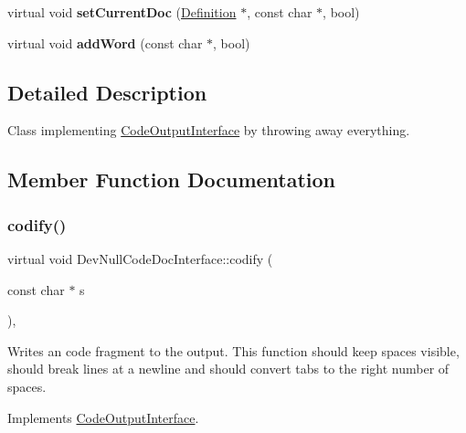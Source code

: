 \begin{DoxyCompactItemize}
\item 
\mbox{\label{class_dev_null_code_doc_interface_aef9f575fa448694b1354e213634f3e95}} 
virtual void {\bfseries set\+Current\+Doc} (\mbox{\hyperlink{class_definition}{Definition}} $\ast$, const char $\ast$, bool)
\item 
\mbox{\label{class_dev_null_code_doc_interface_a8ea71442357b2793532f7bab3a9f6319}} 
virtual void {\bfseries add\+Word} (const char $\ast$, bool)
\end{DoxyCompactItemize}


\subsection{Detailed Description}
Class implementing \mbox{\hyperlink{class_code_output_interface}{Code\+Output\+Interface}} by throwing away everything. 

\subsection{Member Function Documentation}
\mbox{\label{class_dev_null_code_doc_interface_a75e60fd56c45e70af39b3b926e76d53f}} 
\subsubsection{\texorpdfstring{codify()}{codify()}}
{\footnotesize\ttfamily virtual void Dev\+Null\+Code\+Doc\+Interface\+::codify (\begin{DoxyParamCaption}\item[{const char $\ast$}]{s }\end{DoxyParamCaption})\hspace{0.3cm}{\ttfamily [inline]}, {\ttfamily [virtual]}}

Writes an code fragment to the output. This function should keep spaces visible, should break lines at a newline and should convert tabs to the right number of spaces. 

Implements \mbox{\hyperlink{class_code_output_interface_aa29a5eedda08596ace50ed5b59c8ae7f}{Code\+Output\+Interface}}.

\mbox{\label{class_dev_null_code_doc_interface_a5aeb9fdbb29f60058c55adecefab457a}} 
